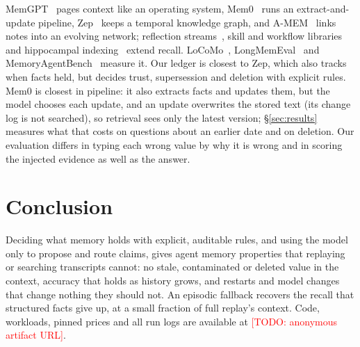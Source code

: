 \documentclass[10pt,conference]{IEEEtran}
\newcommand{\todo}[1]{\textcolor{red}{[TODO: #1]}}
\begin{document}
MemGPT~\cite{packer2023memgpt} pages context like an operating system,
Mem0~\cite{chhikara2025mem0} runs an extract-and-update pipeline,
Zep~\cite{rasmussen2025zep} keeps a temporal knowledge graph, and
A-MEM~\cite{xu2025amem} links notes into an evolving network; reflection
streams~\cite{park2023generative}, skill and workflow
libraries~\cite{wang2023voyager,wang2024awm} and hippocampal
indexing~\cite{gutierrez2024hipporag} extend recall. LoCoMo~\cite{maharana2024locomo},
LongMemEval~\cite{wu2025longmemeval} and MemoryAgentBench~\cite{hu2025memoryagentbench}
measure it. Our ledger is closest to Zep, which also tracks when facts held, but
decides trust, supersession and deletion with explicit rules. Mem0 is closest
in pipeline: it also extracts facts and updates them, but the model chooses
each update, and an update overwrites the stored text (its change log is not
searched), so retrieval sees only the latest version;
\S\ref{sec:results} measures what that costs on questions about an earlier
date and on deletion. Our evaluation differs in typing each wrong value by why it is wrong and in
scoring the injected evidence as well as the answer.

\section{Conclusion}

Deciding what memory holds with explicit, auditable rules, and using the
model only to propose and route claims, gives agent memory properties that
replaying or searching transcripts cannot: no stale, contaminated or deleted
value in the context, accuracy that holds as history grows, and restarts and
model changes that change nothing they should not. An episodic fallback
recovers the recall that structured facts give up, at a small fraction of full
replay's context. Code, workloads, pinned prices and all run logs are
available at \todo{anonymous artifact URL}.



\end{document}
